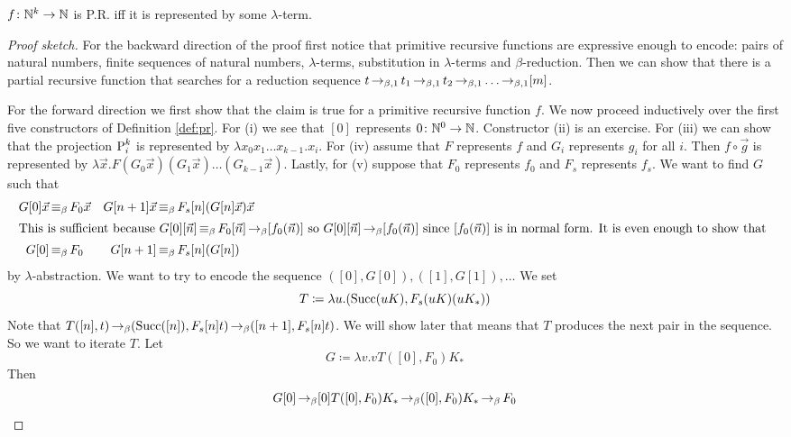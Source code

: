 \begin{boxthm}
    $f \colon \mathbb{N}^k \to \mathbb{N}$ is P.R. iff it is represented by some $\lambda$-term.
\end{boxthm}
\begin{proof}[Proof sketch]
    For the backward direction of the proof first notice that primitive recursive functions are expressive enough to encode: pairs of natural numbers, finite sequences of natural numbers, $\lambda$-terms, substitution in $\lambda$-terms and $\beta$-reduction.
Then we can show that there is a partial recursive function that searches for a reduction sequence $t \operatorname{\to_{\beta, 1}} t_1 \operatorname{\to_{\beta, 1}} t_2 \operatorname{\to_{\beta, 1}} \dots \operatorname{\to_{\beta, 1}} [m]$.

For the forward direction we first show that the claim is true for a primitive recursive function $f$.
We now proceed inductively over the first five constructors of Definition \ref{def:pr}. 
For (i) we see that $[0]$ represents $0 \colon \mathbb{N}^0 \to \mathbb{N}$.
Constructor (ii) is an exercise. 
For (iii) we can show that the projection $\text{P}_{i}^{k}$ is represented by $\lambda x_0 x_1 \dots x_{k-1}. x_i$.
For (iv) assume that $F$ represents $f$ and $G_i$ represents $g_i$ for all $i$. 
Then $f \circ \vec{g}$ is represented by $\lambda \vec{x}. F (G_0 \vec{x}) (G_1 \vec{x}) \dots (G_{k-1} \vec{x})$.
Lastly, for (v) suppose that $F_0$ represents $f_0$ and $F_s$ represents $f_s$. 
We want to find $G$ such that 
\begin{align*}
    G[0]\vec{x} &\operatorname{\equiv_{\beta}} F_0 \vec{x} & G[n + 1]\vec{x} &\operatorname{\equiv_{\beta}} F_s [n] (G[n] \vec{x})\vec{x} \\
    \intertext{This is sufficient because $G[0][\vec{n}] \operatorname{\equiv_{\beta}} F_0[\vec{n}] \operatorname{\to_{\beta}} [f_0(\vec{n})]$ so $G[0][\vec{n}] \operatorname{\to_{\beta}} [f_0(\vec{n})]$ since $[f_0(\vec{n})]$ is in normal form. It is even enough to show that }
    G[0] &\operatorname{\equiv_{\beta}} F_0 & G[n + 1] &\operatorname{\equiv_{\beta}} F_s[n](G[n])
\end{align*}
by $\lambda$-abstraction.
We want to try to encode the sequence $([0], G[0]), ([1], G[1]), \dots$
We set 
\begin{equation*}
T \coloneq \lambda u. (\text{Succ}(uK), F_s(uK)(uK_*))
\end{equation*}
Note that $T([n], t) \operatorname{\to_{\beta}} (\text{Succ}([n]), F_s[n]t) \operatorname{\to_{\beta}} ([n + 1], F_s[n]t)$.
We will show later that means that $T$ produces the next pair in the sequence. 
So we want to iterate $T$.
Let 
\begin{equation*}
    G \coloneq \lambda v.vT([0], F_0)K_*
\end{equation*}
Then 
\begin{equation*}
    G[0] \operatorname{\to_{\beta}} [0]T([0], F_0)K_* \operatorname{\to_{\beta}} ([0], F_0) K_* \operatorname{\to_{\beta}} F_0
\end{equation*}


\end{proof}
